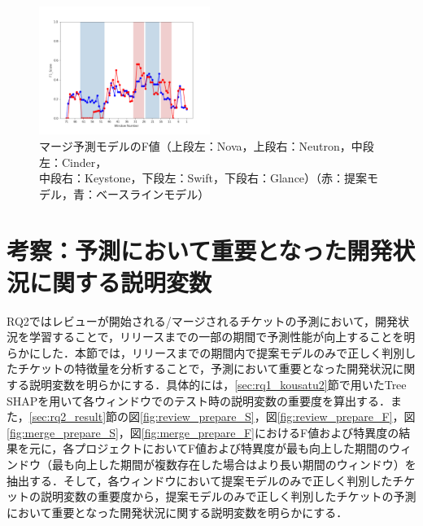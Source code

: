 \documentclass[11pt]{jreport}
\begin{document}
\begin{figure}[H]
\begin{center}
    \includegraphics[width=0.495\textwidth]{Uenaka_fig/RQ2_result/Glance_merge_F1.pdf}
    \caption{マージ予測モデルのF値（上段左：Nova，上段右：Neutron，中段左：Cinder，\\ 中段右：Keystone，下段左：Swift，下段右：Glance）（赤：提案モデル，青：ベースラインモデル）}
    \label{fig:merge_f}
\end{center}
\end{figure}


\section{考察：予測において重要となった開発状況に関する説明変数}\label{sec:rq2_kousatu}
RQ2ではレビューが開始される/マージされるチケットの予測において，開発状況を学習することで，リリースまでの一部の期間で予測性能が向上することを明らかにした．本節では，リリースまでの期間内で提案モデルのみで正しく判別したチケットの特徴量を分析することで，予測において重要となった開発状況に関する説明変数を明らかにする．具体的には，\ref{sec:rq1_kousatu2}節で用いたTree SHAPを用いて各ウィンドウでのテスト時の説明変数の重要度を算出する．また，\ref{sec:rq2_result}節の図\ref{fig:review_prepare_S}，図\ref{fig:review_prepare_F}，図\ref{fig:merge_prepare_S}，図\ref{fig:merge_prepare_F}におけるF値および特異度の結果を元に，各プロジェクトにおいてF値および特異度が最も向上した期間のウィンドウ（最も向上した期間が複数存在した場合はより長い期間のウィンドウ）を抽出する．そして，各ウィンドウにおいて提案モデルのみで正しく判別したチケットの説明変数の重要度から，提案モデルのみで正しく判別したチケットの予測において重要となった開発状況に関する説明変数を明らかにする．
\end{document}
